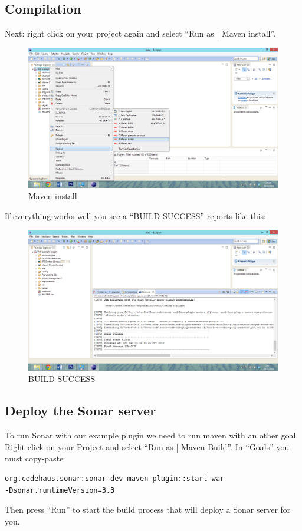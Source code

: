 \subsection{Compilation}
Next: right click on your project again and select "`Run as | Maven install"'.
\begin{figure}
	\centering
		\includegraphics[width=\textwidth]{maveninstall}
	\caption{Maven install}
	\label{fig:maveninstall}
\end{figure} 
If everything works well you see a "`BUILD SUCCESS"' reports like this:
\begin{figure}
	\centering
		\includegraphics[width=\textwidth]{buildsuccess}
	\caption{BUILD SUCCESS}
	\label{fig:buildsuccess}
\end{figure}



\subsection{Deploy the Sonar server}
To run Sonar with our example plugin we need to run maven with an other goal. Right click on your Project and select "`Run as | Maven Build"'. In "`Goals"' you must copy-paste 
\begin{verbatim}
org.codehaus.sonar:sonar-dev-maven-plugin::start-war
-Dsonar.runtimeVersion=3.3
\end{verbatim}
Then press "`Run"' to start the build process that will deploy a Sonar server for you. 


